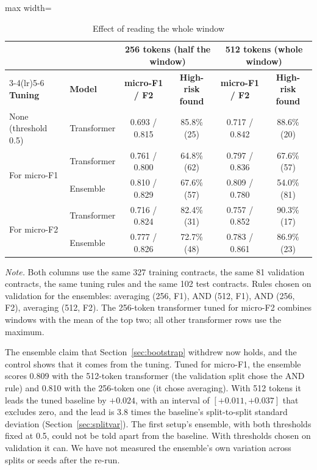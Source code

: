 \begin{table}[!htbp]
\centering
\caption{Effect of reading the whole window}
\label{tab:v2ctrl}
\small
\begin{adjustbox}{max width=\textwidth}
\begin{tabular}{@{}l l c c c c@{}}
\toprule
 & & \multicolumn{2}{c}{\textbf{256 tokens (half the window)}} & \multicolumn{2}{c}{\textbf{512 tokens (whole window)}}\\
\cmidrule(lr){3-4}\cmidrule(lr){5-6}
\textbf{Tuning} & \textbf{Model} & \textbf{micro-F1 / F2} & \textbf{High-risk found} & \textbf{micro-F1 / F2} & \textbf{High-risk found}\\
\midrule
None (threshold 0.5) & Transformer & 0.693 / 0.815 & 85.8\% (25) & 0.717 / 0.842 & 88.6\% (20)\\
\midrule
\multirow{2}{*}{For micro-F1} & Transformer & 0.761 / 0.800 & 64.8\% (62) & 0.797 / 0.836 & 67.6\% (57)\\
 & Ensemble & 0.810 / 0.829 & 67.6\% (57) & 0.809 / 0.780 & 54.0\% (81)\\
\midrule
\multirow{2}{*}{For micro-F2} & Transformer & 0.716 / 0.824 & 82.4\% (31) & 0.757 / 0.852 & 90.3\% (17)\\
 & Ensemble & 0.777 / 0.826 & 72.7\% (48) & 0.783 / 0.861 & 86.9\% (23)\\
\bottomrule
\end{tabular}
\end{adjustbox}

{\footnotesize\singlespacing \emph{Note.} Both columns use the same 327 training contracts, the same 81 validation contracts, the same tuning rules and the same 102 test contracts. Rules chosen on validation for the ensembles: averaging (256, F1), AND (512, F1), AND (256, F2), averaging (512, F2). The 256-token transformer tuned for micro-F2 combines windows with the mean of the top two; all other transformer rows use the maximum.\par}
\end{table}

The ensemble claim that Section~\ref{sec:bootstrap} withdrew now holds, and the control shows that it comes from the tuning. Tuned for micro-F1, the ensemble scores 0.809 with the 512-token transformer (the validation split chose the AND rule) and 0.810 with the 256-token one (it chose averaging). With 512 tokens it leads the tuned baseline by $+0.024$, with an interval of $[+0.011, +0.037]$ that excludes zero, and the lead is 3.8 times the baseline's split-to-split standard deviation (Section~\ref{sec:splitvar}). The first setup's ensemble, with both thresholds fixed at 0.5, could not be told apart from the baseline. With thresholds chosen on validation it can. We have not measured the ensemble's own variation across splits or seeds after the re-run.

